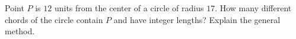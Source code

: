 Point $P$ is $12$ units from the center of a circle of radius $17$. How many different chords of the circle contain $P$ and have integer lengths? Explain the general method.
